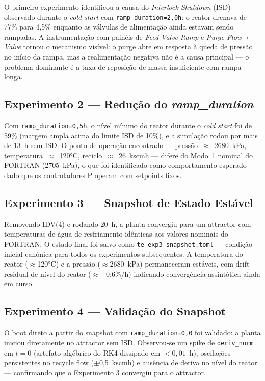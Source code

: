 O primeiro experimento identificou a causa do \textit{Interlock Shutdown} (ISD) observado durante o \textit{cold start} com \texttt{ramp\_duration=2,0h}: o reator drenava de 77\% para 4,5\% enquanto as válvulas de alimentação ainda estavam sendo rampadas. A instrumentação com painéis de \textit{Feed Valve Ramp} e \textit{Purge Flow + Valve} tornou o mecanismo visível: o purge abre em resposta à queda de pressão no início da rampa, mas a realimentação negativa não é a causa principal — o problema dominante é a taxa de reposição de massa insuficiente com rampa longa.

\subsection{Experimento 2 — Redução do \textit{ramp\_duration}}

Com \texttt{ramp\_duration=0,5h}, o nível mínimo do reator durante o \textit{cold start} foi de 59\% (margem ampla acima do limite ISD de 10\%), e a simulação rodou por mais de 13~h sem ISD. O ponto de operação encontrado — pressão~$\approx$~2680~kPa, temperatura~$\approx$~120°C, reciclo~$\approx$~26~kscmh — difere do Modo~1 nominal do FORTRAN (2705~kPa), o que foi identificado como comportamento esperado dado que os controladores P operam com setpoints fixos.

\subsection{Experimento 3 — Snapshot de Estado Estável}

Removendo IDV(4) e rodando 20~h, a planta convergiu para um attractor com temperaturas de água de resfriamento idênticas aos valores nominais do FORTRAN. O estado final foi salvo como \texttt{te\_exp3\_snapshot.toml} — condição inicial canônica para todos os experimentos subsequentes. A temperatura do reator ($\approx$120°C) e a pressão ($\approx$2680~kPa) permaneceram estáveis, com drift residual de nível do reator ($\approx$+0,6\%/h) indicando convergência assintótica ainda em curso.

\subsection{Experimento 4 — Validação do Snapshot}

O boot direto a partir do snapshot com \texttt{ramp\_duration=0,0} foi validado: a planta iniciou diretamente no attractor sem ISD. Observou-se um spike de \texttt{deriv\_norm} em $t=0$ (artefato algébrico do RK4 dissipado em $<0,01$~h), oscilações persistentes no recycle flow ($\pm$0,5~kscmh) e ausência de deriva no nível do reator — confirmando que o Experimento 3 convergiu para o attractor.

